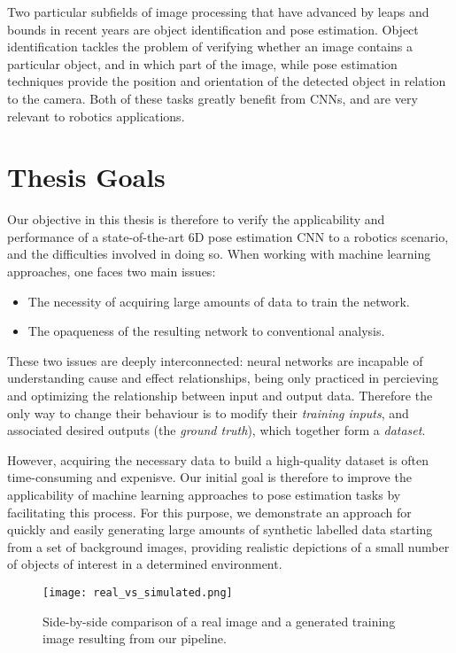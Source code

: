 Two particular subfields of image processing that have advanced by leaps and bounds in recent years are object identification and pose estimation. Object identification tackles the problem of verifying whether an image contains a particular object, and in which part of the image, while pose estimation techniques provide the position and orientation of the detected object in relation to the camera. Both of these tasks greatly benefit from CNNs, and are very relevant to robotics applications.

\section{Thesis Goals}

Our objective in this thesis is therefore to verify the applicability and performance of a state-of-the-art 6D pose estimation CNN to a robotics scenario, and the difficulties involved in doing so. When working with machine learning approaches, one faces two main issues:
\begin{itemize}
    \item The necessity of acquiring large amounts of data to train the network.
    \item The opaqueness of the resulting network to conventional analysis.
\end{itemize}
These two issues are deeply interconnected: neural networks are incapable of understanding cause and effect relationships, being only practiced in percieving and optimizing the relationship between input and output data. Therefore the only way to change their behaviour is to modify their \emph{training inputs}, and associated desired outputs (the \emph{ground truth}), which together form a \emph{dataset}.

However, acquiring the necessary data to build a high-quality dataset is often time-consuming and expenisve. Our initial goal is therefore to improve the applicability of machine learning approaches to pose estimation tasks by facilitating this process. For this purpose, we demonstrate an approach for quickly and easily generating large amounts of synthetic labelled data starting from a set of background images, providing realistic depictions of a small number of objects of interest in a determined environment.

\begin{figure}[ht]
    \texttt{[image: real\_vs\_simulated.png]}
    \caption{Side-by-side comparison of a real image and a generated training image resulting from our pipeline.}
\end{figure}

